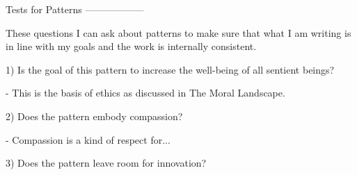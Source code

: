 Tests for Patterns
------------------

These questions I can ask about patterns to make sure that what I am writing is in line with my goals and the work is internally consistent.


1) Is the goal of this pattern to increase the well-being of all sentient beings?

	- This is the basis of ethics as discussed in The Moral Landscape.

2) Does the pattern embody compassion?

	- Compassion is a kind of respect for...

3) Does the pattern leave room for innovation?

